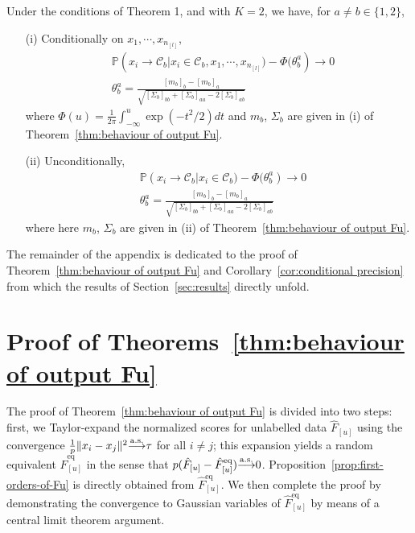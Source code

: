 \documentclass[twoside,11pt]{article}
\def\asto{ {\overset{\rm a.s.}{\longrightarrow}} }
\begin{document}
\begin{corollary}
	\label{cor:conditional precision}
	Under the conditions of Theorem 1, and with $K=2$, we have, for $a\neq b\in\{1,2\}$,
	\begin{itemize}
		\item[(i)] Conditionally on $x_{1},\cdots,x_{n_{[l]}}$,
			\begin{align*}
				&\mathbb{P}\left(x_{i}\to\mathcal{C}_{b}|x_{i}\in\mathcal{C}_{b},x_{1},\cdots,x_{n_{[l]}})-\Phi({\theta}_{b}^{a}\right)\to 0 \\
				&{\theta}_{b}^{a}=\frac{[m_{b}]_{b}-[m_{b}]_{a}}{\sqrt{[\Sigma_{b}]_{bb}+[\Sigma_{b}]_{aa}-2[\Sigma_{b}]_{ab}}}
			\end{align*}
			where  $\Phi(u)=\frac{1}{2\pi}\int_{-\infty}^{u}\exp(-t^{2}/2)dt$ and $m_{b}$, $\Sigma_{b}$ are given in (i) of Theorem~\ref{thm:behaviour of output Fu}.
	
		\item[(ii)] Unconditionally,
			\begin{align*}
				&\mathbb{P}\left(x_{i}\to\mathcal{C}_{b}|x_{i}\in\mathcal{C}_{b})-\Phi({\theta}_{b}^{a}\right)\to 0 \\
				&{\theta}_{b}^{a}=\frac{[m_{b}]_{b}-[m_{b}]_{a}}{\sqrt{[\Sigma_{b}]_{bb}+[\Sigma_{b}]_{aa}-2[\Sigma_{b}]_{ab}}} 
			\end{align*}
			where here $m_{b}$, $\Sigma_{b}$ are given in (ii) of Theorem~\ref{thm:behaviour of output Fu}.
	\end{itemize}	
\end{corollary}

The remainder of the appendix is dedicated to the proof of Theorem~\ref{thm:behaviour of output Fu} and Corollary~\ref{cor:conditional precision} from which the results of Section~\ref{sec:results} directly unfold.

\section{Proof of Theorems~\ref{thm:behaviour of output Fu}}
\label{sec:proof}
The proof of Theorem~\ref{thm:behaviour of output Fu} is divided into two steps: first, we Taylor-expand the normalized scores for unlabelled data $\hat{F}_{[u]}$ using the convergence $\frac1p\|x_i-x_j\|^2\asto \tau$ for all $i\neq j$; this expansion yields a random equivalent $\hat{F}_{[u]}^{\text{eq}}$ in the sense that $p(\hat{F}_{[u]}-\hat{F}_{[u]}^{\text{eq}})\asto 0$. Proposition~\ref{prop:first-orders-of-Fu} is directly obtained from $\hat{F}_{[u]}^{\text{eq}}$. We then complete the proof by demonstrating the convergence to Gaussian variables of $\hat{F}_{[u]}^{\text{eq}}$ by means of a central limit theorem argument.
\end{document}
